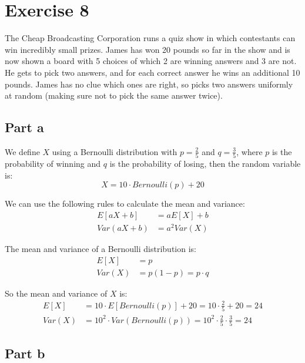 \section{Exercise 8}
The Cheap Broadcasting Corporation runs a quiz show in which contestants can win incredibly small prizes. James has won 20 pounds so far in the show and is now shown a board with 5 choices of which 2 are winning answers and 3 are not. He gets to pick two answers, and for each correct answer he wins an additional 10 pounds. James has no clue which ones are right, so picks two answers uniformly at random (making sure not to pick the same answer twice).

\subsection{Part a}

We define $X$ using a Bernoulli distribution with $p = \frac{2}{5}$ and $q = \frac{3}{5}$, where $p$ is the probability of winning and $q$ is the probability of losing, then the random variable is:
\[
	X = 10\cdot Bernoulli(p) + 20
\]

We can use the following rules to calculate the mean and variance:
\begin{align*}
	E[aX+b]   & = aE[X]+b   \\
	Var(aX+b) & = a^2Var(X)
\end{align*}

The mean and variance of a Bernoulli distribution is:
\begin{align*}
	E[X]   & = p                 \\
	Var(X) & = p(1-p) = p\cdot q
\end{align*}

So the mean and variance of $X$ is:
\begin{align*}
	E[X]   & = 10\cdot E[Bernoulli(p)] + 20 = 10\cdot \frac{2}{5} + 20 = 24              \\
	Var(X) & = 10^2\cdot Var(Bernoulli(p)) = 10^2\cdot \frac{2}{5}\cdot \frac{3}{5} = 24
\end{align*}

\subsection{Part b}

